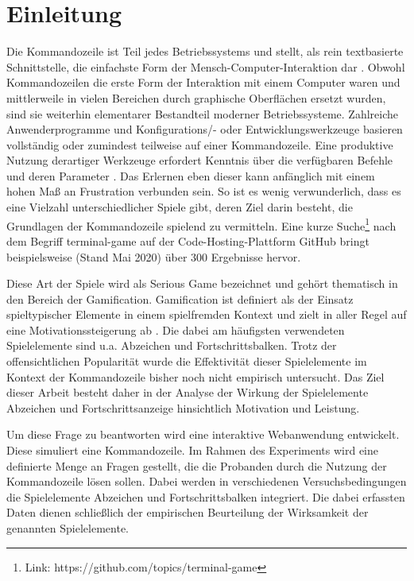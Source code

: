 \section{Einleitung}
Die Kommandozeile ist Teil jedes Betriebssystems und stellt, als rein textbasierte Schnittstelle, die einfachste Form der Mensch-Computer-Interaktion dar \cite{Kumar2005}. Obwohl Kommandozeilen die erste Form der Interaktion mit einem Computer waren und mittlerweile in vielen Bereichen durch graphische Oberflächen ersetzt wurden, sind sie weiterhin elementarer Bestandteil moderner Betriebssysteme. Zahlreiche Anwenderprogramme und Konfigurations/- oder Entwicklungswerkzeuge basieren vollständig oder zumindest teilweise auf einer Kommandozeile. Eine produktive Nutzung derartiger Werkzeuge erfordert Kenntnis über die verfügbaren Befehle und deren Parameter \cite[S.42]{Kumar2005}. Das Erlernen eben dieser kann anfänglich mit einem hohen Maß an Frustration verbunden sein. So ist es wenig verwunderlich, dass es eine Vielzahl unterschiedlicher Spiele gibt, deren Ziel darin besteht, die Grundlagen der Kommandozeile spielend zu vermitteln. Eine kurze Suche\footnote{Link: https://github.com/topics/terminal-game} nach dem Begriff \glqq terminal-game\grqq{} auf der Code-Hosting-Plattform GitHub bringt beispielsweise (Stand Mai  2020)  über  300  Ergebnisse  hervor. 

Diese Art der Spiele wird als Serious Game bezeichnet und gehört thematisch in den Bereich der Gamification. Gamification ist definiert als der Einsatz spieltypischer Elemente in einem spielfremden Kontext \cite{deterding_game_2011} und zielt in aller Regel auf eine Motivationssteigerung ab \cite{takahashi_gamification_2010}. Die  dabei  am  häufigsten  verwendeten  Spielelemente sind u.a. Abzeichen und Fortschrittsbalken. Trotz der offensichtlichen Popularität wurde die Effektivität dieser Spielelemente im Kontext der Kommandozeile bisher noch nicht empirisch untersucht. Das Ziel dieser Arbeit besteht daher in der Analyse der Wirkung der Spielelemente Abzeichen und Fortschrittsanzeige hinsichtlich Motivation und Leistung.

Um diese Frage zu beantworten wird eine interaktive Webanwendung entwickelt. Diese simuliert eine Kommandozeile. Im Rahmen des Experiments wird eine definierte Menge an Fragen gestellt, die die Probanden durch die Nutzung der Kommandozeile lösen sollen. Dabei  werden  in  verschiedenen  Versuchsbedingungen die Spielelemente Abzeichen und Fortschrittsbalken integriert. Die dabei erfassten Daten dienen schließlich der empirischen Beurteilung der Wirksamkeit der genannten Spielelemente.
